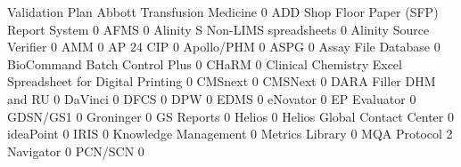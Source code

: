 \documentclass{article}
\begin{document}
\begin{Schunk}
\begin{Soutput}
                                                            Validation Plan
  Abbott Transfusion Medicine                                             0
  ADD Shop Floor Paper (SFP) Report System                                0
  AFMS                                                                    0
  Alinity S Non-LIMS spreadsheets                                         0
  Alinity Source Verifier                                                 0
  AMM                                                                     0
  AP 24 CIP                                                               0
  Apollo/PHM                                                              0
  ASPG                                                                    0
  Assay File Database                                                     0
  BioCommand Batch Control Plus                                           0
  CHaRM                                                                   0
  Clinical Chemistry Excel Spreadsheet for Digital Printing               0
  CMSnext                                                                 0
  CMSNext                                                                 0
  DARA Filler DHM and RU                                                  0
  DaVinci                                                                 0
  DFCS                                                                    0
  DPW                                                                     0
  EDMS                                                                    0
  eNovator                                                                0
  EP Evaluator                                                            0
  GDSN/GS1                                                                0
  Groninger                                                               0
  GS Reports                                                              0
  Helios                                                                  0
  Helios Global Contact Center                                            0
  ideaPoint                                                               0
  IRIS                                                                    0
  Knowledge Management                                                    0
  Metrics Library                                                         0
  MQA Protocol                                                            2
  Navigator                                                               0
  PCN/SCN                                                                 0

\end{Soutput}
\end{Schunk}
\end{document}

